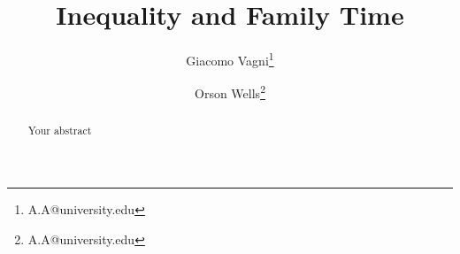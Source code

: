 \documentclass[12pt]{article}
\title{Inequality and Family Time}
\author[1]{Giacomo Vagni\thanks{A.A@university.edu}}
\author[1]{Orson Wells\thanks{A.A@university.edu}}
\affil[1]{Nuffield College, University of Oxford}
\affil[2]{Unversity of Geneva}
\date{}
\begin{document}
\maketitle

\begin{abstract}
  Your abstract
\end{abstract}
\end{document}
